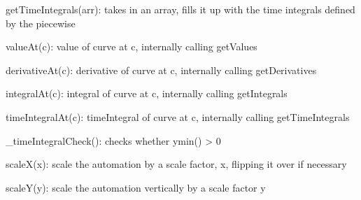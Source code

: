 \documentclass{article}
\begin{document}
getTimeIntegrals(arr): takes in an array, fills it up with the time integrals defined by the piecewise 

valueAt(c): value of curve at c, internally calling getValues

derivativeAt(c): derivative of curve at c, internally calling getDerivatives

integralAt(c): integral of curve at c, internally calling getIntegrals

timeIntegralAt(c): timeIntegral of curve at c, internally calling getTimeIntegrals

\_timeIntegralCheck(): checks whether ymin() > 0

scaleX(x): scale the automation by a scale factor, x, flipping it over if necessary

scaleY(y): scale the automation vertically by a scale factor y
\end{document}
